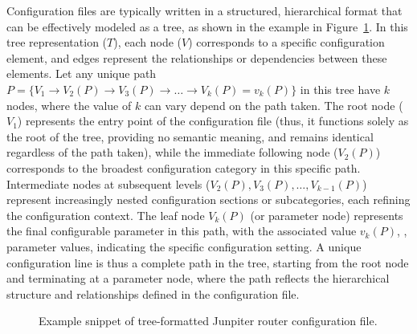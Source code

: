     Configuration files are typically written in a structured, hierarchical format that can be effectively modeled as a tree, as shown in the example in Figure~\ref{fig:tree}. In this tree representation (\(T\)), each node (\(V\)) corresponds to a specific configuration element, and edges represent the relationships or dependencies between these elements. Let any unique path \(
P = \{ V_1 \rightarrow V_2(P) \rightarrow V_3(P) \rightarrow \dots \rightarrow V_k(P) = v_k(P) \}
\) in this tree have \(k\) nodes, where the value of \(k\) can vary depend on the path taken. The root node (\(V_1\)) represents the entry point of the configuration file (thus, it functions solely as the root of the tree, providing no semantic meaning, and remains identical regardless of the path taken), while the immediate following node (\(V_2(P)\)) corresponds to the broadest configuration category in this specific path. Intermediate nodes at subsequent levels (\( V_2(P), V_3(P), \dots, V_{k-1}(P) \)) represent increasingly nested configuration sections or subcategories, each refining the configuration context. The leaf node \(V_k(P)\) (or parameter node) represents the final configurable parameter in this path, with the associated value \(v_k(P)\), \ie, parameter values, indicating the specific configuration setting. A unique configuration line is thus a complete path in the tree, starting from the root node and terminating at a parameter node, where the path reflects the hierarchical structure and relationships defined in the configuration file.
\begin{figure}[t]
    \centering
    \caption{Example snippet of tree-formatted Junpiter router configuration file.}
    \label{fig:tree}
\end{figure}


